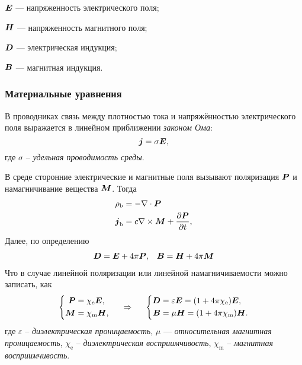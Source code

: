 \begin{description*}
    \item[$\mbox{\boldmath $E$}$]  --- напряженность электрического поля;
    \item[$\mbox{\boldmath $H$}$]  --- напряженность магнитного поля;
    \item[$\mbox{\boldmath $D$}$]  --- электрическая индукция;
    \item[$\mbox{\boldmath $B$}$]  --- магнитная индукция.
\end{description*}

\subsubsection*{Материальные уравнения}

В проводниках связь между плотностью тока и напряжённостью электрического поля выражается в линейном приближении \textit{законом Ома}:
\begin{equation*}
    \mbox{\boldmath $j$} = \sigma \mbox{\boldmath $E$},
\end{equation*}
где $\sigma$ -- \textit{удельная проводимость среды}.

В среде сторонние электрические и магнитные поля вызывают поляризация $\mbox{\boldmath $P$}$ и намагничивание вещества $\mbox{\boldmath $M$}$.
Тогда
\begin{align*}
    \rho_\text{b} &= - \nabla \cdot \mbox{\boldmath $P$} \\
    \mbox{\boldmath $j$}_\text{b} &= c \nabla \times \mbox{\boldmath $M$} + \frac{\partial \mbox{\boldmath $P$}}{\partial t} ,
\end{align*}
Далее, по определению
\begin{align*}
    \mbox{\boldmath $D$} &= \mbox{\boldmath $E$} + 4\pi \mbox{\boldmath $P$}, &\mbox{\boldmath $B$} &= \mbox{\boldmath $H$} + 4 \pi \mbox{\boldmath $M$} \\
\end{align*}
Что в случае линейной поляризации или линейной намагничиваемости можно записать, как  
$$
    \left\{\begin{aligned}
        \mbox{\boldmath $P$} &= \chi_{\text{e}} \mbox{\boldmath $E$}, \\
        \mbox{\boldmath $M$} &= \chi_{\text{m}} \mbox{\boldmath $H$}, \\
    \end{aligned}\right.
    \hspace{0.5cm} \Rightarrow \hspace{0.5cm} 
    \left\{\begin{aligned}
         \mbox{\boldmath $D$} &= \varepsilon \mbox{\boldmath $E$} = (1 + 4\pi \chi_{\text{e}}) \mbox{\boldmath $E$}, \\
       \mbox{\boldmath $B$} &= \mu \mbox{\boldmath $H$} = (1 + 4 \pi \chi_{\text{m}}) \mbox{\boldmath $H$}.
    \end{aligned}\right.
$$
где $\varepsilon$ -- \textit{ диэлектрическая проницаемость}, $\mu$  — \textit{относительная магнитная проницаемость}, $\chi_{\text{e}}$  -- \textit{диэлектрическая восприимчивость}, $\chi_{\text{m}}$ -- \textit{магнитная восприимчивость}.

